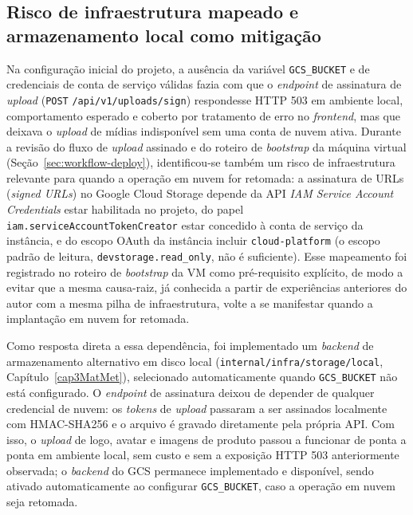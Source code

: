\subsection{Risco de infraestrutura mapeado e armazenamento local como mitigação}
\label{sec:falha-infra-armazenamento}

Na configuração inicial do projeto, a ausência da variável \texttt{GCS\_BUCKET} e de credenciais de conta de serviço válidas fazia com que o \textit{endpoint} de assinatura de \textit{upload} (\texttt{POST} \texttt{/\allowbreak{}api/\allowbreak{}v1/\allowbreak{}uploads/\allowbreak{}sign}) respondesse HTTP 503 em ambiente local, comportamento esperado e coberto por tratamento de erro no \textit{frontend}, mas que deixava o \textit{upload} de mídias indisponível sem uma conta de nuvem ativa. Durante a revisão do fluxo de \textit{upload} assinado e do roteiro de \textit{bootstrap} da máquina virtual (Seção~\ref{sec:workflow-deploy}), identificou-se também um risco de infraestrutura relevante para quando a operação em nuvem for retomada: a assinatura de URLs (\textit{signed URLs}) no Google Cloud Storage depende da API \textit{IAM Service Account Credentials} estar habilitada no projeto, do papel \texttt{iam.serviceAccountTokenCreator} estar concedido à conta de serviço da instância, e do escopo OAuth da instância incluir \texttt{cloud-platform} (o escopo padrão de leitura, \texttt{devstorage.read\_only}, não é suficiente). Esse mapeamento foi registrado no roteiro de \textit{bootstrap} da VM como pré-requisito explícito, de modo a evitar que a mesma causa-raiz, já conhecida a partir de experiências anteriores do autor com a mesma pilha de infraestrutura, volte a se manifestar quando a implantação em nuvem for retomada.

Como resposta direta a essa dependência, foi implementado um \textit{backend} de armazenamento alternativo em disco local (\texttt{internal/\allowbreak{}infra/\allowbreak{}storage/\allowbreak{}local}, Capítulo~\ref{cap3MatMet}), selecionado automaticamente quando \texttt{GCS\_BUCKET} não está configurado. O \textit{endpoint} de assinatura deixou de depender de qualquer credencial de nuvem: os \textit{tokens} de \textit{upload} passaram a ser assinados localmente com HMAC-SHA256 e o arquivo é gravado diretamente pela própria API. Com isso, o \textit{upload} de logo, avatar e imagens de produto passou a funcionar de ponta a ponta em ambiente local, sem custo e sem a exposição HTTP 503 anteriormente observada; o \textit{backend} do GCS permanece implementado e disponível, sendo ativado automaticamente ao configurar \texttt{GCS\_BUCKET}, caso a operação em nuvem seja retomada.

